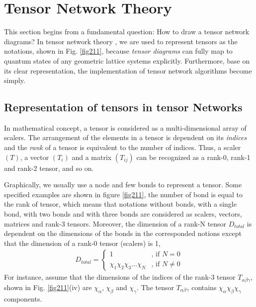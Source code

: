 \chapter{Tensor Network Theory} 
This section begins from a fundamental question: How to draw a tensor network diagrams? In tensor network theory \cite{jordan_studies_2011} \cite{orus_practical_2014} \cite{bauer_tensor_2011}, we are used to represent tensors as the notations, shown in Fig. \ref{fig211}, because \textit{tensor diagrams} can fully map to quantum states of any geometric lattice systems explicitly. Furthermore, base on its clear representation, the implementation of tensor network algorithms become simply. 

\section{Representation of tensors in tensor Networks}
\label{notations}
In mathematical concept, a tensor is considered as a multi-dimensional array of scalers. The arrangement of the elements in a tensor is dependent on its \textit{indices} and the \textit{rank} of a tensor is equivalent to the number of indices. Thus, a scaler $(T)$, a vector $(T_{i})$ and a matrix $(T_{ij})$ can be recognized as a rank-0, rank-1 and rank-2 tensor, and so on. 

Graphically, we usually use a node and few bonds to represent a tensor. Some specified examples are shown in figure \ref{fig211}, the number of bond is equal to the rank of tensor, which means that notations without bonds, with a single bond, with two bonds and with three bonds are considered as scalers, vectors, matrices and rank-3 tensors. Moreover, the dimension of a rank-N tensor $D_{total}$ is dependent on the dimensions of the bonds in the corresponded notions except that the dimension of a rank-0 tensor (scalers) is 1,
\begin{align}
	D_{total} = \begin{cases}
		1 & \text{, if $N = 0$} \\
		\chi_{1}\chi_{2}\chi_{3} \dots \chi_{N} & \text{, if $N \neq 0$}
	\end{cases}
\end{align}
For instance, assume that the dimensions of the indices of the rank-3 tensor $T_{\alpha \beta \gamma}$, shown in Fig. \ref{fig211}(iv) are $\chi_{\alpha}$, $\chi_{\beta}$ and $\chi_{\gamma}$. The tensor $T_{\alpha \beta \gamma}$ contains $\chi_{\alpha}$$\chi_{\beta}$$\chi_{\gamma}$ components.

